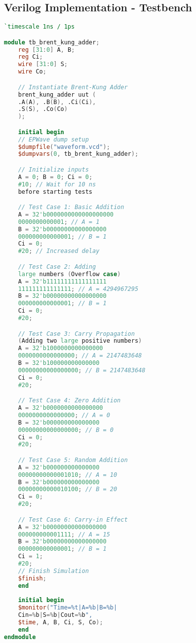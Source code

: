 \documentclass{IEEEtran}
\begin{document}
\subsection{Verilog Implementation - Testbench}
\begin{lstlisting}[language=Verilog]
`timescale 1ns / 1ps

module tb_brent_kung_adder;
    reg [31:0] A, B;
    reg Ci;
    wire [31:0] S;
    wire Co;

    // Instantiate Brent-Kung Adder
    brent_kung_adder uut (
    .A(A), .B(B), .Ci(Ci),
    .S(S), .Co(Co)
    );

    initial begin
    // EPWave dump setup
    $dumpfile("waveform.vcd");  
    $dumpvars(0, tb_brent_kung_adder);

    // Initialize inputs
    A = 0; B = 0; Ci = 0;
    #10; // Wait for 10 ns 
    before starting tests

    // Test Case 1: Basic Addition
    A = 32'b0000000000000000000
    0000000000001; // A = 1
    B = 32'b00000000000000000
    000000000000001; // B = 1
    Ci = 0;  
    #20; // Increased delay

    // Test Case 2: Adding 
    large numbers (Overflow case)
    A = 32'b11111111111111111
    111111111111111; // A = 4294967295
    B = 32'b00000000000000000
    000000000000001; // B = 1
    Ci = 0;
    #20;

    // Test Case 3: Carry Propagation
    (Adding two large positive numbers)
    A = 32'b1000000000000000
    0000000000000000; // A = 2147483648
    B = 32'b100000000000000
    00000000000000000; // B = 2147483648
    Ci = 0;
    #20;

    // Test Case 4: Zero Addition
    A = 32'b0000000000000000
    0000000000000000; // A = 0
    B = 32'b000000000000000
    00000000000000000; // B = 0
    Ci = 0;
    #20;

    // Test Case 5: Random Addition
    A = 32'b000000000000000
    00000000000001010; // A = 10
    B = 32'b000000000000000
    00000000000010100; // B = 20
    Ci = 0;
    #20;

    // Test Case 6: Carry-in Effect
    A = 32'b00000000000000000
    000000000001111; // A = 15
    B = 32'b00000000000000000
    000000000000001; // B = 1
    Ci = 1;
    #20;
    // Finish Simulation
    $finish;
    end
    
    initial begin
    $monitor("Time=%t|A=%b|B=%b|
    Cin=%b|S=%b|Cout=%b",
    $time, A, B, Ci, S, Co);
    end
endmodule\end{lstlisting}
\end{document}
